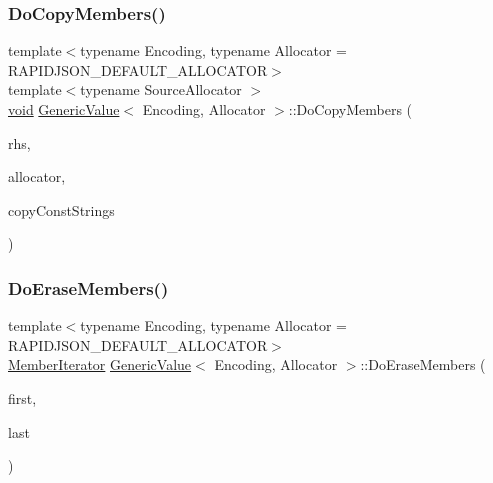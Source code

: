 \subsubsection{\texorpdfstring{Do\+Copy\+Members()}{DoCopyMembers()}}
{\footnotesize\ttfamily template$<$typename Encoding, typename Allocator = R\+A\+P\+I\+D\+J\+S\+O\+N\+\_\+\+D\+E\+F\+A\+U\+L\+T\+\_\+\+A\+L\+L\+O\+C\+A\+T\+OR$>$ \\
template$<$typename Source\+Allocator $>$ \\
\hyperlink{imgui__impl__opengl3__loader_8h_ac668e7cffd9e2e9cfee428b9b2f34fa7}{void} \hyperlink{classGenericValue}{Generic\+Value}$<$ Encoding, Allocator $>$\+::Do\+Copy\+Members (\begin{DoxyParamCaption}\item[{const \hyperlink{classGenericValue}{Generic\+Value}$<$ Encoding, Source\+Allocator $>$ \&}]{rhs,  }\item[{Allocator \&}]{allocator,  }\item[{bool}]{copy\+Const\+Strings }\end{DoxyParamCaption})\hspace{0.3cm}{\ttfamily [inline]}}

\mbox{\label{classGenericValue_a786fc0f1116ef209216884b13f814158}} 
\subsubsection{\texorpdfstring{Do\+Erase\+Members()}{DoEraseMembers()}}
{\footnotesize\ttfamily template$<$typename Encoding, typename Allocator = R\+A\+P\+I\+D\+J\+S\+O\+N\+\_\+\+D\+E\+F\+A\+U\+L\+T\+\_\+\+A\+L\+L\+O\+C\+A\+T\+OR$>$ \\
\hyperlink{classGenericValue_a349b8faae61edc42b4289726820be439}{Member\+Iterator} \hyperlink{classGenericValue}{Generic\+Value}$<$ Encoding, Allocator $>$\+::Do\+Erase\+Members (\begin{DoxyParamCaption}\item[{\hyperlink{classGenericValue_aac08c3e660a9036d3dcb8b10ff6c61f4}{Const\+Member\+Iterator}}]{first,  }\item[{\hyperlink{classGenericValue_aac08c3e660a9036d3dcb8b10ff6c61f4}{Const\+Member\+Iterator}}]{last }\end{DoxyParamCaption})\hspace{0.3cm}{\ttfamily [inline]}}

